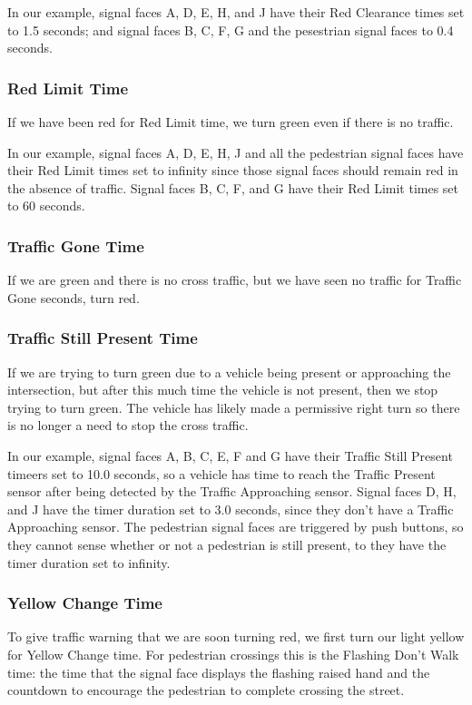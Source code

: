 \documentclass[letterpaper,twoside]{article}
\begin{document}
In our example, signal faces A, D, E, H, and J have their Red Clearance
times set to 1.5 seconds; and signal faces B, C, F, G and the pesestrian
signal faces to 0.4 seconds.

\subsubsection{Red Limit Time}
If we have been red for Red Limit time, we turn green even if there is
no traffic.

In our example, signal faces A, D, E, H, J and all the pedestrian
signal faces have their
Red Limit times set to infinity since those signal faces should
remain red in the absence of traffic.
Signal faces B, C, F, and G have their Red Limit times set to 60 seconds.

\subsubsection{Traffic Gone Time}
If we are green and there is no cross traffic, but we have seen no traffic
for Traffic Gone seconds, turn red.

\subsubsection{Traffic Still Present Time}
If we are trying to turn green due to a vehicle being present or approaching
the intersection, but after this much time the vehicle is not present, then
we stop trying to turn green.  The vehicle has likely made a permissive right
turn so there is no longer a need to stop the cross traffic.

In our example, signal faces A, B, C, E, F and G have their Traffic Still
Present timeers set to 10.0 seconds, so a vehicle has time to reach
the Traffic Present sensor after being detected by the Traffic Approaching
sensor.  Signal faces D, H, and J have the timer duration set to 3.0 seconds,
since they don't have a Traffic Approaching sensor. The pedestrian signal
faces are triggered by push buttons, so they cannot sense whether or not
a pedestrian is still present, to they have the timer duration set to
infinity.

\subsubsection{Yellow Change Time}
To give traffic warning that we are soon turning red, we first turn our light
yellow for Yellow Change time.  For pedestrian crossings this is the
Flashing Don't Walk time: the time that the signal face displays the flashing
raised hand and the countdown to encourage the pedestrian to complete
crossing the street.
\end{document}
